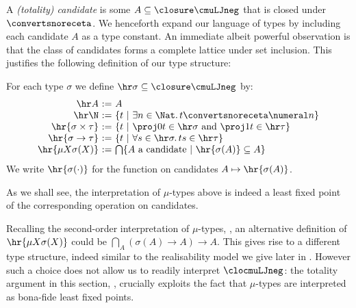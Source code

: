 A \emph{(totality) candidate} is some $A\subseteq \closure \cmuLJneg$ that is closed under $\convertsnoreceta$.
We henceforth expand our language of types by including each candidate $A$ as a type constant. 
% 
An immediate albeit powerful observation is that the class of candidates forms a complete lattice under set inclusion.
This justifies the following definition of our type structure:
\begin{definition}
    \label{def:hr}
    For each type $\sigma$ we define $\hr\sigma \subseteq \closure \cmuLJneg$ by:
    \[
    \begin{array}{r@{\ := \ }l}
         \hr A & A \\
         \hr \N & \{ t  \ \vert \ \exists n \in \Nat .\, t\convertsnoreceta \numeral n\} \\
         \hr {\sigma \times \tau} & \{ t \ \vert\ \proj 0 t \in \hr \sigma \text{ and }  \proj 1 t \in \hr \tau\} \\
         \hr {\sigma \to \tau} & \{ t \ \vert\ \forall s \in \hr \sigma. \, ts \in \hr\tau\} \\
         \hr {\mu X\sigma(X)} & \bigcap \{ A \text{ a candidate} \ \vert\ \hr{\sigma(A)}\subseteq A\}
    \end{array}
    \]
    We write $\hr{\sigma(\cdot)}$ for the function on candidates $A\mapsto \hr{\sigma(A)}$.
\end{definition}
As we shall see, the interpretation of $\mu$-types above is indeed a least fixed point of the corresponding operation on candidates.

\begin{remark}
    Recalling the second-order interpretation of $\mu$-types, , an alternative definition of $\hr {\mu X \sigma(X)}$ could be $\bigcap_A (\sigma(A)\to A) \to A$.
    This gives rise to a different type structure, indeed similar to the realisability model we give later in .
    However such a choice does not allow us to readily interpret $\clocmuLJneg$: the totality argument in this section, , crucially exploits the fact that $\mu$-types are interpreted as bona-fide least fixed points.
\end{remark}

